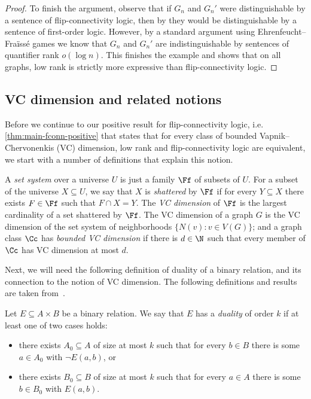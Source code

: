 \begin{proof}
    To finish the argument, observe that if $G_n$ and $G_n'$ were distinguishable by a sentence of flip-connectivity logic, then by  they would be distinguishable by a sentence of first-order logic.
    However, by a standard argument using Ehrenfeucht--Fraïssé games we know that $G_n$ and $G_n'$ are indistinguishable by \fo sentences of quantifier rank $o(\log n)$.
    This finishes the example and shows that on all graphs, low rank \mso is strictly more expressive than flip-connectivity logic.
\end{proof}

\subsection{VC dimension and related notions} \label{ssec:vcdim}
Before we continue to our positive result for flip-connectivity logic, i.e. \cref{thm:main-fconn-positive} that states that for every class of bounded Vapnik--Chervonenkis (VC) dimension, low rank \mso and flip-connectivity logic are equivalent, we start with a number of definitions that explain this notion.

A {\em{set system}} over a universe $U$ is just a family $\Ff$ of subsets of $U$. For a subset of the universe $X\subseteq U$, we say that $X$ is {\em{shattered}} by $\Ff$ if for every $Y\subseteq X$ there exists $F\in \Ff$ such that $F\cap X=Y$. The {\em{VC dimension}} of $\Ff$ is the largest cardinality of a set shattered by $\Ff$. The VC dimension of a graph $G$ is the VC dimension of the set system of neighborhoods $\{N(v)\colon v\in V(G)\}$; and a graph class $\Cc$ has {\em{bounded VC dimension}} if there is $d\in \N$ such that every member of $\Cc$ has VC dimension at most $d$.

Next, we will need the following definition of duality of a binary relation, and its connection to the notion of VC dimension. The following definitions and results are taken from~\cite{incremental-lemma}.

\begin{definition}
    Let $E \subseteq A \times B$ be a binary relation.
    We say that $E$ has a {\em{duality}} of order $k$ if at least one of two cases holds:
    \begin{itemize}[nosep]
        \item there exists $A_0 \subseteq A$ of size at most $k$ such that for every $b \in B$ there is some $a \in A_0$ with $\neg E(a, b)$, or
        \item there exists $B_0 \subseteq B$ of size at most $k$ such that for every $a \in A$ there is some $b \in B_0$ with $E(a, b)$.
    \end{itemize}
\end{definition}

